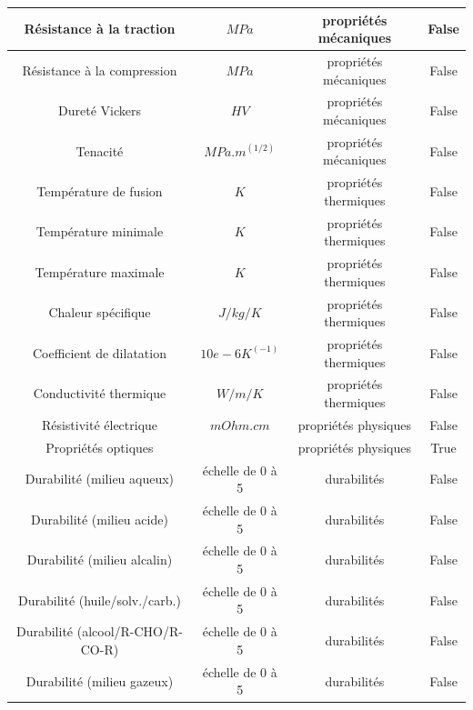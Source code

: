 \documentclass[12pt,a4paper]{article}
\begin{document}
\begin{table}
\begin{center}
\begin{tabular}{|c|c|c|c|}
                \hline
                Résistance à la traction & $MPa$ & propriétés mécaniques & False \\
                \hline
                Résistance à la compression & $MPa$ & propriétés mécaniques & False \\
                \hline
                Dureté Vickers & $HV$ & propriétés mécaniques & False \\
                \hline
                Tenacité & $MPa.m^(1/2)$ & propriétés mécaniques & False \\
                \hline
                Température de fusion & $K$ & propriétés thermiques & False \\
                \hline
                Température minimale & $K$ & propriétés thermiques & False \\
                \hline
                Température maximale & $K$ & propriétés thermiques & False \\
                \hline
                Chaleur spécifique & $J/kg/K$ & propriétés thermiques & False \\
                \hline
                Coefficient de dilatation & $10e-6 K^(-1)$ & propriétés thermiques & False \\
                \hline
                Conductivité thermique & $W/m/K$ & propriétés thermiques & False \\
                \hline
                Résistivité électrique & $mOhm.cm$ & propriétés physiques & False \\
                \hline
                Propriétés optiques &   & propriétés physiques & True \\
                \hline
                Durabilité (milieu aqueux) & échelle de 0 à 5 & durabilités & False \\
                \hline
                Durabilité (milieu acide) & échelle de 0 à 5 & durabilités & False \\
                \hline
                Durabilité (milieu alcalin) & échelle de 0 à 5 & durabilités & False \\
                \hline
                Durabilité (huile/solv./carb.) & échelle de 0 à 5 & durabilités & False \\
                \hline
                Durabilité (alcool/R-CHO/R-CO-R) & échelle de 0 à 5 & durabilités & False \\
                \hline
                Durabilité (milieu gazeux) & échelle de 0 à 5 & durabilités & False \\

\end{tabular}
\end{center}
\end{table}
\end{document}
